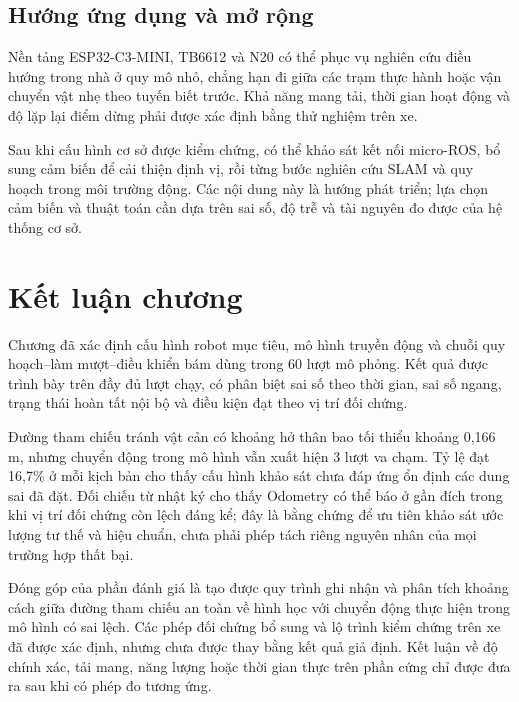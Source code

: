 \documentclass[12pt,a4paper,oneside]{report}
\begin{document}
\subsection{Hướng ứng dụng và mở rộng}

Nền tảng ESP32-C3-MINI, TB6612 và N20 có thể phục vụ nghiên cứu điều hướng trong nhà ở quy mô nhỏ, chẳng hạn đi giữa các trạm thực hành hoặc vận chuyển vật nhẹ theo tuyến biết trước. Khả năng mang tải, thời gian hoạt động và độ lặp lại điểm dừng phải được xác định bằng thử nghiệm trên xe.

Sau khi cấu hình cơ sở được kiểm chứng, có thể khảo sát kết nối micro-ROS, bổ sung cảm biến để cải thiện định vị, rồi từng bước nghiên cứu SLAM và quy hoạch trong môi trường động. Các nội dung này là hướng phát triển; lựa chọn cảm biến và thuật toán cần dựa trên sai số, độ trễ và tài nguyên đo được của hệ thống cơ sở.

\section{Kết luận chương}

Chương đã xác định cấu hình robot mục tiêu, mô hình truyền động và chuỗi quy hoạch--làm mượt--điều khiển bám dùng trong 60 lượt mô phỏng. Kết quả được trình bày trên đầy đủ lượt chạy, có phân biệt sai số theo thời gian, sai số ngang, trạng thái hoàn tất nội bộ và điều kiện đạt theo vị trí đối chứng.

Đường tham chiếu tránh vật cản có khoảng hở thân bao tối thiểu khoảng 0,166 m, nhưng chuyển động trong mô hình vẫn xuất hiện 3 lượt va chạm. Tỷ lệ đạt 16,7\% ở mỗi kịch bản cho thấy cấu hình khảo sát chưa đáp ứng ổn định các dung sai đã đặt. Đối chiếu từ nhật ký cho thấy Odometry có thể báo ở gần đích trong khi vị trí đối chứng còn lệch đáng kể; đây là bằng chứng để ưu tiên khảo sát ước lượng tư thế và hiệu chuẩn, chưa phải phép tách riêng nguyên nhân của mọi trường hợp thất bại.

Đóng góp của phần đánh giá là tạo được quy trình ghi nhận và phân tích khoảng cách giữa đường tham chiếu an toàn về hình học với chuyển động thực hiện trong mô hình có sai lệch. Các phép đối chứng bổ sung và lộ trình kiểm chứng trên xe đã được xác định, nhưng chưa được thay bằng kết quả giả định. Kết luận về độ chính xác, tải mang, năng lượng hoặc thời gian thực trên phần cứng chỉ được đưa ra sau khi có phép đo tương ứng.

\end{document}
